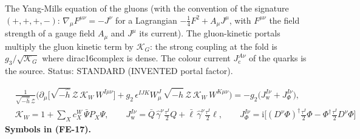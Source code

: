 \documentclass[
  10pt,
]{article}
\begin{document}
The Yang-Mills equation of the gluons (with the convention of the
signature \((+,+,+,-)\): \(\nabla_\mu F^{\mu\nu} = -J^\nu\) for a
Lagrangian \(-\frac14F^2 + A_\mu J^\mu\), with \(F^{\mu\nu}\) the field
strength of a gauge field \(A_\mu\) and \(J^\mu\) its current). The
gluon-kinetic portals multiply the gluon kinetic term by
\(\mathcal{K}_{G}\): the strong coupling at the fold is
\(g_3/\sqrt{\mathcal{K}_{G}}\) where dirac16complex is dense. The colour
current \(J_{\mathrm{c}}^{A\nu}\) of the quarks is the source. Status:
STANDARD (INVENTED portal factor).

\[
\begin{aligned}
&\frac{1}{\sqrt{-\hat h}\,\mathcal{Z}}\Big(\partial_\mu\big[\sqrt{-\hat h}\,\mathcal{Z}\,\mathcal{K}_{W}\,W^{I\mu\nu}\big]
 + g_2\,\epsilon^{IJK}W^J_\mu\,\sqrt{-\hat h}\,\mathcal{Z}\,\mathcal{K}_{W}\,W^{K\mu\nu}\Big)
 = -g_2\big(J_{\mathrm{w}}^{I\nu} + J_\Phi^{I\nu}\big),\\
&\mathcal{K}_{W} = 1 + \sum_X c^{W}_X\,\bar\Psi P_X\Psi,\qquad J_{\mathrm{w}}^{I\nu} = \bar Q\,\hat\gamma^\nu\frac{\tau^I}{2}Q + \bar\ell\,\hat\gamma^\nu\frac{\tau^I}{2}\ell,\qquad
 J_\Phi^{I\nu} = \mathrm{i}\Big[(D^\nu\Phi)^\dagger\frac{\tau^I}{2}\Phi - \Phi^\dagger\frac{\tau^I}{2}D^\nu\Phi\Big]
\end{aligned} \tag{FE-17}
\] \textbf{Symbols in (FE-17).}
\end{document}
